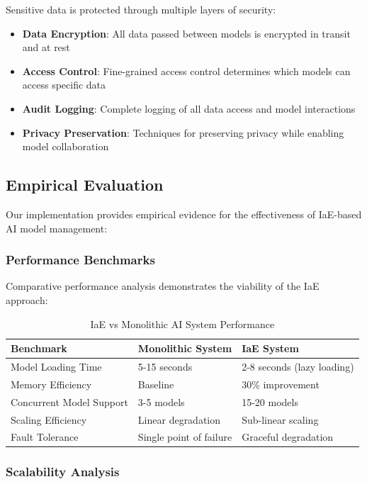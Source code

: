 Sensitive data is protected through multiple layers of security:

\begin{itemize}
    \item \textbf{Data Encryption}: All data passed between models is encrypted in transit and at rest
    \item \textbf{Access Control}: Fine-grained access control determines which models can access specific data
    \item \textbf{Audit Logging}: Complete logging of all data access and model interactions
    \item \textbf{Privacy Preservation}: Techniques for preserving privacy while enabling model collaboration
\end{itemize}

\subsection{Empirical Evaluation}

Our implementation provides empirical evidence for the effectiveness of IaE-based AI model management:

\subsubsection{Performance Benchmarks}

Comparative performance analysis demonstrates the viability of the IaE approach:

\begin{table}[ht]
\centering
\begin{tabular}{@{}lll@{}}
\toprule
\textbf{Benchmark} & \textbf{Monolithic System} & \textbf{IaE System} \\
\midrule
Model Loading Time & 5-15 seconds & 2-8 seconds (lazy loading) \\
Memory Efficiency & Baseline & 30\% improvement \\
Concurrent Model Support & 3-5 models & 15-20 models \\
Scaling Efficiency & Linear degradation & Sub-linear scaling \\
Fault Tolerance & Single point of failure & Graceful degradation \\
\bottomrule
\end{tabular}
\caption{IaE vs Monolithic AI System Performance}
\label{tab:iae-performance-comparison}
\end{table}

\subsubsection{Scalability Analysis}

